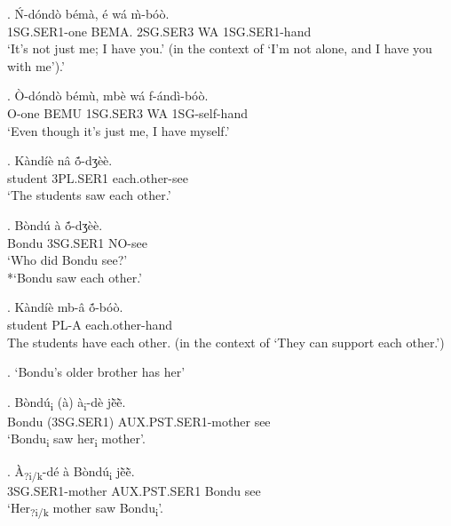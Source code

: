 \documentclass{assets/fieldnotes}
\begin{document}
\exg. \'{N}-d\'{o}nd\`{o} b\'{e}m\`{a}, \'{e} w\'{a} \`{m}-b\'{o}\`{o}. \\
1SG.SER1-one BEMA. 2SG.SER3 WA 1SG.SER1-hand \\
`It's not just me; I have you.' (in the context of `I'm not alone, and I have you with me').' 

\exg. \`{O}-d\'{o}nd\`{o} b\'{e}m\`{u}, mb\`{e} w\'{a} f-\'{a}nd\`{i}-b\'{o}\`{o}. \\
O-one BEMU 1SG.SER3 WA 1SG-self-hand \\
`Even though it's just me, I have myself.' 

\exg. K\`{a}nd\'{i}\`{e} n\^{a} \textipa{\textltailn}ṍ-dʒ\`{e}\`{e}. \\
student 3PL.SER1 each.other-see \\
`The students saw each other.' 

\exg. B\`{o}nd\'{u} \`{a} \textipa{\textltailn}ṍ-dʒ\`{e}\`{e}. \\
Bondu 3SG.SER1 NO-see \\
`Who did Bondu see?' \\
*`Bondu saw each other.' 

\exg. K\`{a}nd\'{i}\`{e} mb-\^{a} \textipa{\textltailn}ṍ-b\'{o}\`{o}. \\
student PL-A each.other-hand \\
The students have each other. (in the context of `They can support each other.') 

\ex. `Bondu's older brother has her'


\exg. B\`{o}nd\'{u}\textsubscript{i} (\`{a}) \`{a}\textsubscript{i}-d\`{e} jẽ̀ẽ̀. \\
Bondu (3SG.SER1) AUX.PST.SER1-mother see \\
`Bondu\textsubscript{i} saw her\textsubscript{i} mother'. 

\exg. \`{A}\textsubscript{?i/k}-d\'{e} \`{a} B\`{o}nd\'{u}\textsubscript{i} jẽ̀ẽ̀. \\
3SG.SER1-mother AUX.PST.SER1 Bondu see \\
`Her\textsubscript{?i/k} mother saw Bondu\textsubscript{i}'. 
\end{document}

